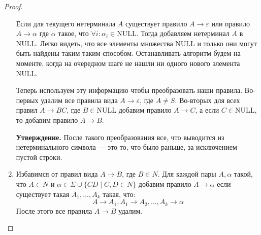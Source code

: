 \begin{proof}
\begin{enumerate}
    Если для текущего нетерминала $A$ существует правило $A \to \varepsilon$ или правило $A \to \alpha$ где $\alpha$ такое, что $\forall i\colon \alpha_i \in \mathrm{NULL}$. Тогда добавляем нетерминал $A$ в $\mathrm{NULL}$. Легко видеть, что все элементы множества $\mathrm{NULL}$ и только они могут быть найдены таким таким способом. 
    Останавливать алгоритм будем на моменте, когда на очередном шаге не нашли ни одного нового элемента $\mathrm{NULL}$.

    Теперь используем эту информацию чтобы преобразовать наши правила. Во-первых удалим все правила вида $A \to \varepsilon$, где $A \neq S$. Во-вторых для всех правил $A \to BC$, где $B \in \mathrm{NULL}$ добавим правило $A \to C$, а если $C \in \mathrm{NULL}$, то добавим правило $A \to B$.

    \textbf{Утверждение.} После такого преобразования все, что выводится из нетерминального символа --- это то, что было раньше, за исключением пустой строки.

    \item Избавимся от правил вида $A \to B$, где $B \in N$. Для каждой пары $A, \alpha$ такой, что $A \in N$ и $\alpha \in \Sigma \cup \{CD \; | \; C, D \in N\}$ добавим правило $A \to \alpha$ если существует такая $A_1, \dotsc, A_k$ такая, что:
    \begin{equation*}
      A \to A_1, A_1 \to A_2, \dotsc, A_k \to \alpha
    \end{equation*}
    После этого все правила $A \to B$ удалим.
  \end{enumerate}
\end{proof}
